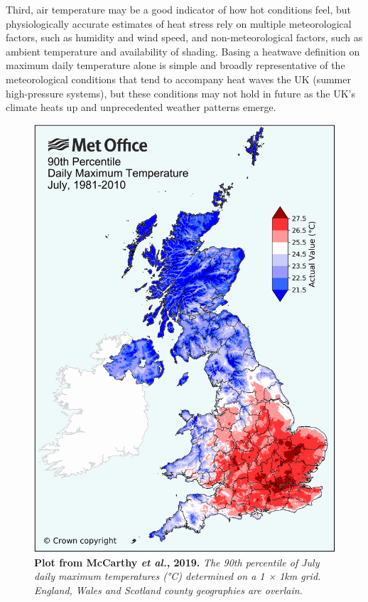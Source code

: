 \documentclass[10pt,letterpaper]{article}
\begin{document}
Third, air temperature may be a good indicator of how hot conditions feel, but physiologically accurate estimates of heat stress rely on multiple meteorological factors, such as humidity and wind speed, and non-meteorological factors, such as ambient temperature and availability of shading.
Basing a heatwave definition on maximum daily temperature alone is simple and broadly representative of the meteorological conditions that tend to accompany heat waves the UK (summer high-pressure systems), but these conditions may not hold in future as the UK's climate heats up and unprecedented weather patterns emerge.

\begin{figure}
    \begin{center}
        \includegraphics[width=0.65\linewidth]{./mccarthy2019-fig3.jpg}
    \end{center}
    \caption{
    {\bf Plot from McCarthy \textit{et al.}, 2019.}
    \textit{The 90th percentile of July daily maximum temperatures (°C) determined on a 1 × 1km grid. England, Wales and Scotland county geographies are overlain.}\cite{McCarthy2019}
    }
    \label{McCarthy-fig3}
\end{figure}
\end{document}
